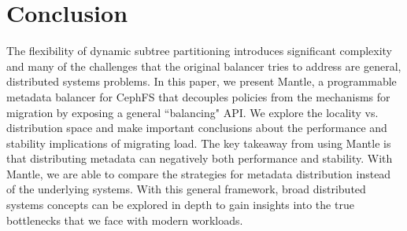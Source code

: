 \section{Conclusion}
The flexibility of dynamic subtree partitioning introduces significant complexity and many of the challenges that the original balancer tries to address are general, distributed systems problems. In this paper, we present Mantle, a programmable metadata balancer for CephFS that decouples policies from the mechanisms for migration by exposing a general ``balancing" API. We explore the locality vs. distribution space and make important conclusions about the performance and stability implications of migrating load. The key takeaway from using Mantle is that distributing metadata can negatively both performance and stability. With Mantle, we are able to compare the strategies for metadata distribution instead of the underlying systems. With this general framework, broad distributed systems concepts can be explored in depth to gain insights into the true bottlenecks that we face with modern workloads. 
